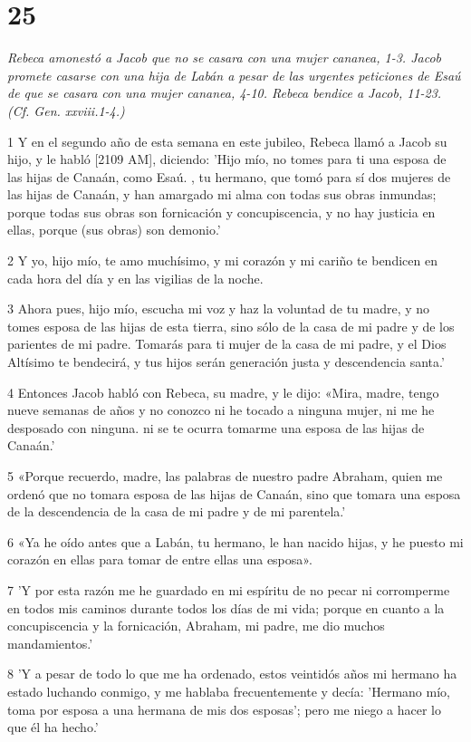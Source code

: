 \chapter{25}

\par \textit{Rebeca amonestó a Jacob que no se casara con una mujer cananea, 1-3. Jacob promete casarse con una hija de Labán a pesar de las urgentes peticiones de Esaú de que se casara con una mujer cananea, 4-10. Rebeca bendice a Jacob, 11-23. (Cf. Gen. xxviii.1-4.)}

\par 1 Y en el segundo año de esta semana en este jubileo, Rebeca llamó a Jacob su hijo, y le habló [2109 AM], diciendo: 'Hijo mío, no tomes para ti una esposa de las hijas de Canaán, como Esaú. , tu hermano, que tomó para sí dos mujeres de las hijas de Canaán, y han amargado mi alma con todas sus obras inmundas; porque todas sus obras son fornicación y concupiscencia, y no hay justicia en ellas, porque (sus obras) son demonio.'
\par 2 Y yo, hijo mío, te amo muchísimo, y mi corazón y mi cariño te bendicen en cada hora del día y en las vigilias de la noche.
\par 3 Ahora pues, hijo mío, escucha mi voz y haz la voluntad de tu madre, y no tomes esposa de las hijas de esta tierra, sino sólo de la casa de mi padre y de los parientes de mi padre. Tomarás para ti mujer de la casa de mi padre, y el Dios Altísimo te bendecirá, y tus hijos serán generación justa y descendencia santa.'
\par 4 Entonces Jacob habló con Rebeca, su madre, y le dijo: «Mira, madre, tengo nueve semanas de años y no conozco ni he tocado a ninguna mujer, ni me he desposado con ninguna. ni se te ocurra tomarme una esposa de las hijas de Canaán.'
\par 5 «Porque recuerdo, madre, las palabras de nuestro padre Abraham, quien me ordenó que no tomara esposa de las hijas de Canaán, sino que tomara una esposa de la descendencia de la casa de mi padre y de mi parentela.'
\par 6 «Ya he oído antes que a Labán, tu hermano, le han nacido hijas, y he puesto mi corazón en ellas para tomar de entre ellas una esposa».
\par 7 'Y por esta razón me he guardado en mi espíritu de no pecar ni corromperme en todos mis caminos durante todos los días de mi vida; porque en cuanto a la concupiscencia y la fornicación, Abraham, mi padre, me dio muchos mandamientos.'
\par 8 'Y a pesar de todo lo que me ha ordenado, estos veintidós años mi hermano ha estado luchando conmigo, y me hablaba frecuentemente y decía: 'Hermano mío, toma por esposa a una hermana de mis dos esposas'; pero me niego a hacer lo que él ha hecho.'
